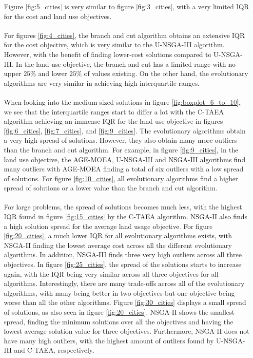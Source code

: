 \documentclass[mscthesis, 11pt]{usiinfthesis}
\theoremstyle{newdefinition}
\begin{document}
Figure \ref{fig:5_cities} is very similar to figure \ref{fig:3_cities}, with a very limited IQR for the cost and land use objectives. 
\\\\
For figures \ref{fig:4_cities}, the branch and cut algorithm obtains an extensive IQR for the cost objective, which is very similar to the U-NSGA-III algorithm. However, with the benefit of finding lower-cost solutions compared to U-NSGA-III. In the land use objective, the branch and cut has a limited range with no upper $25\%$ and lower $25\%$ of values existing. On the other hand, the evolutionary algorithms are very similar in achieving high interquartile ranges.
\\\\
When looking into the medium-sized solutions in figure \ref{fig:boxplot_6_to_10}, we see that the interquartile ranges start to differ a lot with the C-TAEA algorithm achieving an immense IQR for the land use objective in figures \ref{fig:6_cities}, \ref{fig:7_cities}, and \ref{fig:9_cities}. The evolutionary algorithms obtain a very high spread of solutions. However, they also obtain many more outliers than the branch and cut algorithm. For example, in figure \ref{fig:9_cities}, in the land use objective, the AGE-MOEA, U-NSGA-III and NSGA-III algorithms find many outliers with AGE-MOEA finding a total of six outliers with a low spread of solutions. For figure \ref{fig:10_cities}, all evolutionary algorithms find a higher spread of solutions or a lower value than the branch and cut algorithm.
\\\\
For large problems, the spread of solutions becomes much less, with the highest IQR found in figure \ref{fig:15_cities} by the C-TAEA algorithm. NSGA-II also finds a high solution spread for the average land usage objective. For figure \ref{fig:20_cities}, a much lower IQR for all evolutionary algorithms exists, with NSGA-II finding the lowest average cost across all the different evolutionary algorithms. In addition, NSGA-III finds three very high outliers across all three objectives. In figure \ref{fig:25_cities}, the spread of the solutions starts to increase again, with the IQR being very similar across all three objectives for all algorithms. Interestingly, there are many trade-offs across all of the evolutionary algorithms, with many being better in two objectives but one objective being worse than all the other algorithms.
Figure \ref{fig:30_cities} displays a small spread of solutions, as also seen in figure \ref{fig:20_cities}. NSGA-II shows the smallest spread, finding the minimum solutions over all the objectives and having the lowest average solution value for three objectives. Furthermore, NSGA-II does not have many high outliers, with the highest amount of outliers found by U-NSGA-III and C-TAEA, respectively.
\end{document}
